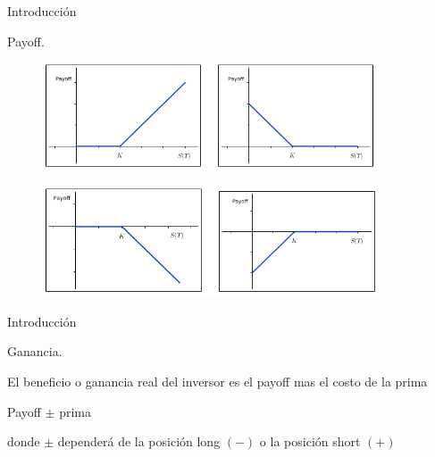 \documentclass{beamer}
\begin{document}
\begin{frame}{Introducci\'on}

  \begin{block}{Payoff.}

    \begin{figure}[H]
      \centering
      \includegraphics[width=10cm]{payofflong}
      \label{longpayoff}
    \end{figure}

    \begin{figure}[H]
      \centering
      \includegraphics[width=10cm]{payoffshort}
      \label{shortpayoff}
    \end{figure}

  \end{block}
\end{frame}



\begin{frame}{Introducci\'on}

    \begin{block}{Ganancia.}

    El beneficio o ganancia real del inversor es el payoff mas el costo de la prima 
    
    \centerline{Payoff $\pm$ prima}

    donde $\pm$ depender\'a de la posici\'on long $(-)$ o la posici\'on short $(+)$

    \end{block}


\end{frame}
\end{document}
